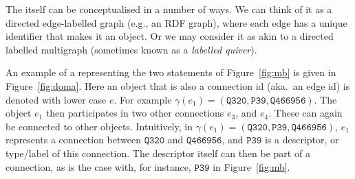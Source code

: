 The \data itself can be conceptualised in a number of ways. We can think of it as a directed edge-labelled graph (e.g., an RDF graph), where each edge has a unique identifier that makes it an object. Or we may consider it as akin to a directed labelled multigraph (sometimes known as a \emph{labelled quiver}).

An example of a \data representing the two statements of Figure~\ref{fig:mb} is given in Figure~\ref{fig:doma}. Here an object that is also a connection id (aka.\ an edge id) is denoted with lower case $e$. For example $\gamma(e_1) = (\texttt{Q320},\texttt{P39},\texttt{Q466956})$. The object $e_1$ then participates in two other connections $e_3$, and $e_4$. These can again be connected to other objects. Intuitively, in  $\gamma(e_1) = (\texttt{Q320},\texttt{P39},\texttt{Q466956})$, $e_1$ represents a connection between $\texttt{Q320}$ and $\texttt{Q466956}$, and $\texttt{P39}$ is a descriptor, or type/label of this connection. The descriptor itself can then be part of a connection, as is the case with, for instance, $\texttt{P39}$ in Figure~\ref{fig:mb}.


%
%
%
%  
%  
%
%
%  
%

